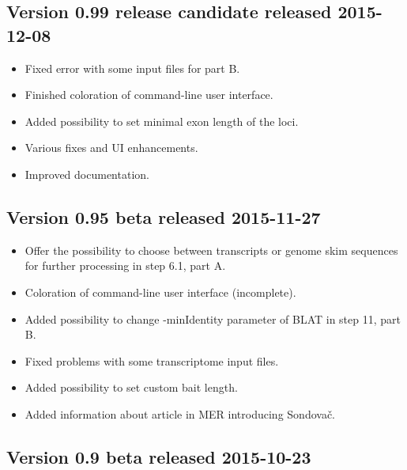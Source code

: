 \documentclass[a4paper, 11pt, twoside]{article}
\begin{document}
\subsection{Version 0.99 release candidate released 2015-12-08}

\begin{itemize}
  \item Fixed error with some input files for part B.
  \item Finished coloration of command-line user interface.
  \item Added possibility to set minimal exon length of the loci.
  \item Various fixes and UI enhancements.
  \item Improved documentation.
\end{itemize}

\subsection{Version 0.95 beta released 2015-11-27}

\begin{itemize}
  \item Offer the possibility to choose between transcripts or genome skim sequences for further processing in step 6.1, part A.
  \item Coloration of command-line user interface (incomplete).
  \item Added possibility to change -minIdentity parameter of BLAT in step 11, part B.
  \item Fixed problems with some transcriptome input files.
  \item Added possibility to set custom bait length.
  \item Added information about article in MER introducing Sondovač.
\end{itemize}

\subsection{Version 0.9 beta released 2015-10-23}
\end{document}
